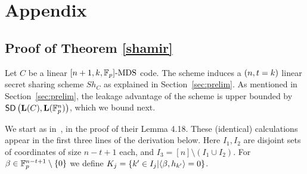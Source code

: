 \chapter{Appendix}

\section{Proof of Theorem \ref{shamir}} %
\label{proof-shamir}

Let $C$ be a linear $[n+1,k,\mathbb{F}_p]\text{-MDS}$ code. The scheme induces a $(n,t=k)$ linear secret sharing scheme $Sh_C$ as explained in Section~\ref{sec:prelim}.
As mentioned in Section~\ref{sec:prelim}, the leakage advantage of the scheme is upper bounded by $\mathsf{SD} \left({\mathbf{L}(C)},{\mathbf{L}(\mathbb{F}^n_p)} \right)$, which we bound next. 

We start as in~\cite{EPRINT:BDIR19}, in the proof of their Lemma 4.18. These (identical)
calculations appear in the first three lines of the derivation below. Here $I_1,I_2$ are disjoint sets of coordinates of size $n-t+1$ each, and $I_3=[n]\setminus{(I_1\cup I_2)}$. For $\beta\in 
\mathbb{F}^{n-t+1}_p\setminus{\{0\}}$ we define $K_j=\{k' \in I_j | \langle\beta,h_{k'}\rangle=0 \}$.

